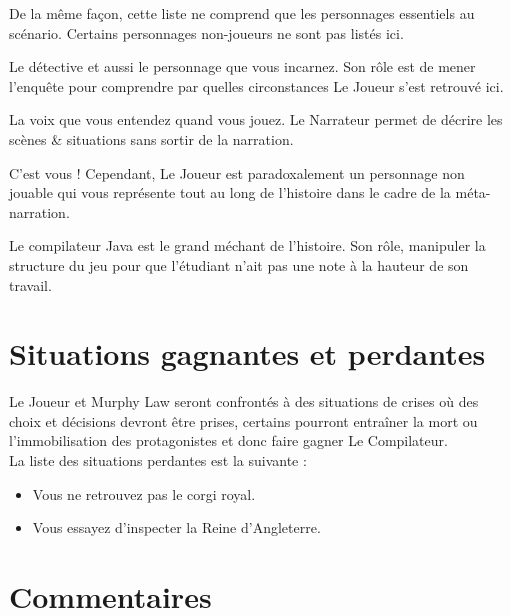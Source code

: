 \documentclass[a4paper,12pt]{report}
\begin{document}
De la même façon, cette liste ne comprend que les personnages essentiels au scénario. Certains personnages non-joueurs ne sont pas listés ici.

\begin{description}[leftmargin=!,labelwidth=\widthof{\bfseries Le Compilateur}]
  \item [Murphy Law] Le détective et aussi le personnage que vous incarnez. Son rôle est de mener l'enquête pour comprendre par quelles circonstances Le Joueur s'est retrouvé ici.
  \item [Le Narrateur] La voix que vous entendez quand vous jouez. Le Narrateur permet de décrire les scènes \& situations sans sortir de la narration. 
  \item [Le Joueur] C'est vous ! Cependant, Le Joueur est paradoxalement un personnage non jouable qui vous représente tout au long de  l'histoire dans le cadre de la méta-narration.
  \item [Le Compilateur] Le compilateur Java est le grand méchant de l'histoire. Son rôle, manipuler la structure du jeu pour que l'étudiant n'ait pas une note à la hauteur de son travail.
\end{description}

\section{Situations gagnantes et perdantes}

Le Joueur et Murphy Law seront confrontés à des situations de crises où des choix et décisions devront être prises, certains pourront entraîner la mort ou l'immobilisation des protagonistes et donc faire gagner Le Compilateur.\\
La liste des situations perdantes est la suivante :

\begin{description}[align=left,leftmargin=!,labelwidth=\widthof{\bfseries A Buckingham Palace}]
  \item [A Buckingham Palace] \begin{itemize}
    \item Vous ne retrouvez pas le corgi royal.
    \item Vous essayez d'inspecter la Reine d'Angleterre.
  \end{itemize}
\end{description}

\section{Commentaires}
\end{document}
